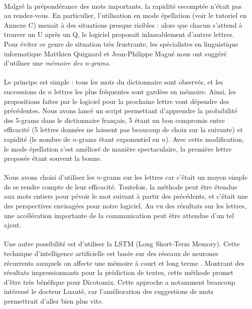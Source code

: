 \documentclass[11pt,a4paper]{article}
\theoremstyle{plain}
\theoremstyle{definition}
\begin{document}
\paragraph{} Malgré la prépondérance des mots importants, la rapidité escomptée n'était pas au rendez-vous. En particulier, l'utilisation en mode épellation (voir le tutoriel en Annexe C) menait à des situations presque risibles : alors que chacun s'attend à trouver un U après un Q, le logiciel proposait inlassablement d'autres lettres. Pour éviter ce genre de situation très frustrante, les spécialistes en linguistique informatique Matthieu Quignard et Jean-Philippe Magué nous ont suggéré d'utiliser une \textit{mémoire des n-grams}.

\paragraph{} Le principe est simple : tous les mots du dictionnaire sont observés, et les successions de $n$ lettres les plus fréquentes sont gardées en mémoire. Ainsi, les propositions faites par le logiciel pour la prochaine lettre vont dépendre des précédentes. Nous avons lancé un script permettant d'apprendre la probabilité des 5-grams dans le dictionnaire français, 5 étant un bon compromis entre efficacité (5 lettres données ne laissent pas beaucoup de choix sur la suivante) et rapidité (le nombre de $n$-grams étant exponentiel en $n$). Avec cette modification, le mode épellation s'est amélioré de manière spectaculaire, la première lettre proposée étant souvent la bonne.

\paragraph{} Nous avons choisi d'utiliser les $n$-grams sur les lettres car c'était un moyen simple de se rendre compte de leur efficacité. Toutefois, la méthode peut être étendue aux mots entiers pour pévoir le mot suivant à partir des précédents, et c'était une des perspectives envisagées pour notre logiciel. Au vu des résultats sur les lettres, une accélération importante de la communication peut être attendue d'un tel ajout.

\paragraph{} Une autre possibilité est d'utiliser la LSTM (Long Short-Term Memory). Cette technique d'intelligence artificielle est basée sur des réseaux de neurones récurrents auxquels on affecte une mémoire à court et long terme%
.
Montrant des résultats impressionnants pour la prédiction de textes, cette méthode promet d'être très bénéfique pour Dicotomix. Cette approche a notamment beaucoup intéressé le docteur Luauté, car l'amélioration des suggestions de mots permettrait d'aller bien plus vite.
\end{document}
